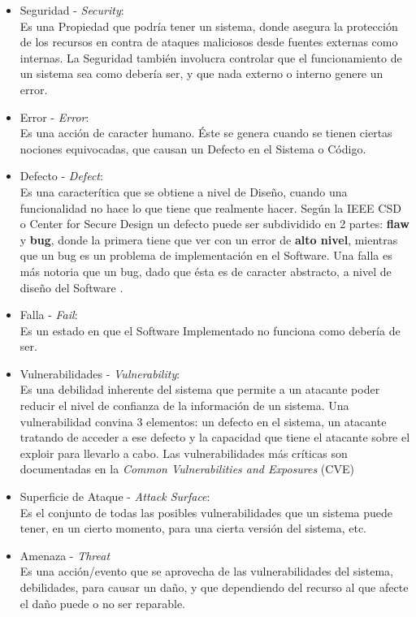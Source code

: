 \begin{itemize}
	\item Seguridad - \textit{Security}:
		\\Es una Propiedad que podría tener un sistema, donde asegura la protección de los recursos en contra de ataques maliciosos desde fuentes externas como internas. La Seguridad también involucra controlar que el funcionamiento de un sistema sea como debería ser, y que nada externo o interno genere un error.
	\item Error - \textit{Error}:
		\\Es una acción de caracter humano. Éste se genera cuando se tienen ciertas nociones equivocadas, que causan un Defecto en el Sistema o Código.
	\item Defecto  - \textit{Defect}:
		\\Es una caracterítica que se obtiene a nivel de Diseño, cuando una funcionalidad no hace lo que tiene que realmente hacer. Según la IEEE CSD o Center for Secure Design un defecto puede ser subdividido en 2 partes: \textbf{flaw} y \textbf{bug}, donde la primera tiene que ver con un error de \textbf{alto nivel}, mientras que un bug es un problema de implementación en el Software. Una falla es más notoria que un bug, dado que ésta es de caracter abstracto, a nivel de diseño del Software \cite{ieeecsd}.
	\item Falla - \textit{Fail}:
		\\Es un estado en que el Software Implementado no funciona como debería de ser.
	\item Vulnerabilidades - \textit{Vulnerability}:
		\\Es una debilidad inherente del sistema que permite a un atacante poder reducir el nivel de confianza de la información de un sistema. Una vulnerabilidad convina 3 elementos: un defecto en el sistema, un atacante tratando de acceder a ese defecto y la capacidad que tiene el atacante sobre el exploir para llevarlo a cabo. Las vulnerabilidades más críticas son documentadas en la \textit{Common Vulnerabilities and Exposures} (CVE) \cite{cve}  
	\item Superficie de Ataque - \textit{Attack Surface}:
		\\Es el conjunto de todas las posibles vulnerabilidades que un sistema puede tener, en un cierto momento, para una cierta versión del sistema, etc.
	\item Amenaza - \textit{Threat}
		\\Es una acción/evento que se aprovecha de las vulnerabilidades del sistema, debilidades, para causar un daño, y que dependiendo del recurso al que afecte el daño puede o no ser reparable.

\end{itemize}
